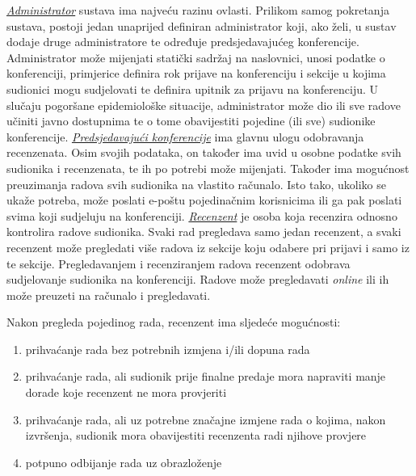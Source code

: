 		\underline{\textit{Administrator}} sustava ima najveću razinu ovlasti. Prilikom samog pokretanja sustava, postoji jedan unaprijed definiran administrator koji, ako želi, u sustav dodaje druge administratore te određuje predsjedavajućeg konferencije. Administrator može mijenjati statički sadržaj na naslovnici, unosi podatke o konferenciji, primjerice definira rok prijave na konferenciju i sekcije u kojima sudionici mogu sudjelovati te definira upitnik za prijavu na konferenciju. U slučaju pogoršane epidemiološke situacije, administrator može dio ili sve radove učiniti javno dostupnima te o tome obavijestiti pojedine (ili sve) sudionike konferencije.
		\newline
		\newline
		\indent \underline{\textit{Predsjedavajući konferencije}} ima glavnu ulogu odobravanja recenzenata. Osim svojih podataka, on također ima uvid u osobne podatke svih sudionika i recenzenata, te ih po potrebi može mijenjati. Također ima mogućnost preuzimanja radova svih sudionika na vlastito računalo. Isto tako, ukoliko se ukaže potreba, može poslati e-poštu pojedinačnim korisnicima ili ga pak poslati svima koji sudjeluju na konferenciji. 
		\newline
		\newline
		\indent \underline{\textit{Recenzent}} je osoba koja recenzira odnosno kontrolira radove sudionika. Svaki rad pregledava samo jedan recenzent, a svaki recenzent može pregledati više radova iz sekcije koju odabere pri prijavi i samo iz te sekcije. Pregledavanjem i recenziranjem radova recenzent odobrava sudjelovanje sudionika na konferenciji. Radove može pregledavati \textit{online} ili ih može preuzeti na računalo i pregledavati. 

		
		Nakon pregleda pojedinog rada, recenzent ima sljedeće mogućnosti:
		
		\begin{enumerate}
			
			\item prihvaćanje rada bez potrebnih izmjena i/ili dopuna rada
			\item prihvaćanje rada, ali sudionik prije finalne predaje mora napraviti manje dorade koje recenzent ne mora provjeriti
			\item prihvaćanje rada, ali uz potrebne značajne izmjene rada o kojima, nakon izvršenja, sudionik mora obavijestiti recenzenta radi njihove provjere
			\item potpuno odbijanje rada uz obrazloženje
			
		\end{enumerate}

